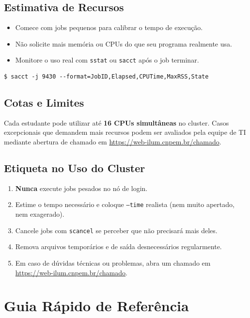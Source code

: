\documentclass[11pt, a4paper]{article}
\newcommand{\cmd}[1]{\texttt{\textcolor{codeblue}{#1}}}
\begin{document}
\subsection{Estimativa de Recursos}

\begin{itemize}
  \item Comece com jobs pequenos para calibrar o tempo de execução.
  \item Não solicite mais memória ou CPUs do que seu programa realmente usa.
  \item Monitore o uso real com \cmd{sstat} ou \cmd{sacct} após o job terminar.
\end{itemize}

\begin{lstlisting}[style=terminal]
$ sacct -j 9430 --format=JobID,Elapsed,CPUTime,MaxRSS,State
\end{lstlisting}

\subsection{Cotas e Limites}

Cada estudante pode utilizar até \textbf{16 CPUs simultâneas} no cluster.
Casos excepcionais que demandem mais recursos podem ser avaliados pela equipe
de TI mediante abertura de chamado em
\url{https://web-ilum.cnpem.br/chamado}.

\subsection{Etiqueta no Uso do Cluster}

\begin{enumerate}
  \item \textbf{Nunca} execute jobs pesados no nó de login.
  \item Estime o tempo necessário e coloque \texttt{--time} realista (nem muito
        apertado, nem exagerado).
  \item Cancele jobs com \cmd{scancel} se perceber que não precisará mais deles.
  \item Remova arquivos temporários e de saída desnecessários regularmente.
  \item Em caso de dúvidas técnicas ou problemas, abra um chamado em
        \url{https://web-ilum.cnpem.br/chamado}.
\end{enumerate}

\section{Guia Rápido de Referência}
\end{document}
